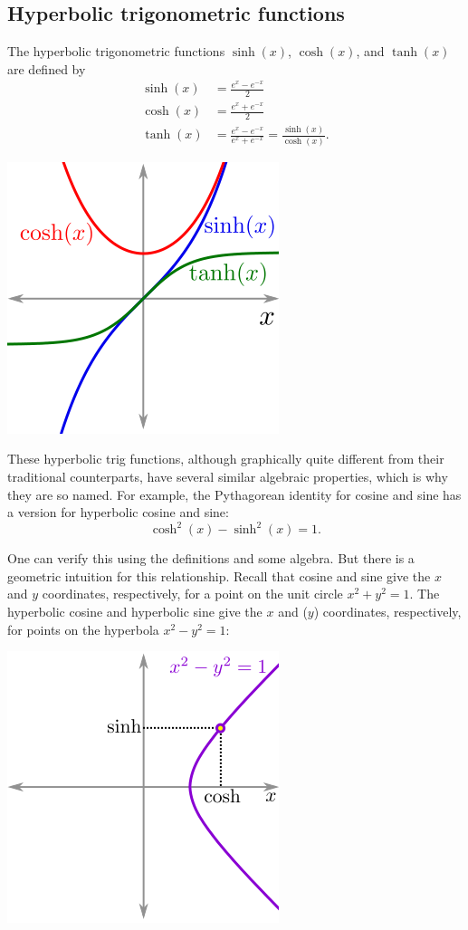 \documentclass[twoside,openright,titlepage,a4paper]{book}
\begin{document}
\begin{sloppypar}
\subsection{Hyperbolic trigonometric functions}
The hyperbolic trigonometric functions ${\sinh(x)}$, ${\cosh(x)}$, and ${\tanh(x)}$ are defined by
\begin{align*}
\sinh(x) &= \frac{e^x - e^{-x}}{2} \\
\cosh(x) &= \frac{e^x+e^{-x}}{2} \\
\tanh(x) &= \frac{e^x - e^{-x}}{e^x + e^{-x}} = \frac{\sinh(x)}{\cosh(x)}.
\end{align*}
\begin{center}
	\includegraphics[scale=0.6]{Hyperbolic}
\end{center}

These hyperbolic trig functions, although graphically quite different from their traditional counterparts, have several similar algebraic properties, which is why they are so named. For example, the Pythagorean identity for cosine and sine has a version for hyperbolic cosine and sine: \[\cosh^2(x)-\sinh^2(x)=1.\]

One can verify this using the definitions and some algebra. But there is a geometric intuition for this relationship. Recall that cosine and sine give the $x$ and $y$ coordinates, respectively, for a point on the unit circle ${x^2+y^2=1}$. The hyperbolic cosine and hyperbolic sine give the $x$ and ($y$) coordinates, respectively, for points on the hyperbola ${x^2-y^2=1}$:
\begin{center}
	\includegraphics[scale=0.6]{HyperbolicPlot}
\end{center}


\end{sloppypar}
\end{document}
